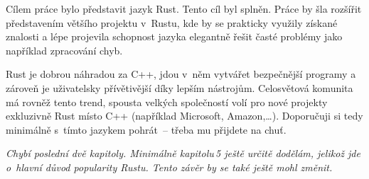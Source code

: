 \documentclass[main.tex]{subfiles}
\begin{document}

Cílem práce bylo představit jazyk Rust. Tento cíl byl splněn. Práce by šla rozšířit
představením většího projektu v~Rustu, kde by se prakticky využily získané znalosti a lépe
projevila schopnost jazyka elegantně řešit časté problémy jako například zpracování chyb.

Rust je dobrou náhradou za C++, jdou v~něm vytvářet bezpečnější programy a zároveň je
uživatelsky přívětivější díky lepším nástrojům. Celosvětová komunita má rovněž tento
trend, spousta velkých společností volí pro nové projekty exkluzivně Rust místo C++
(například Microsoft, Amazon,\dots). Doporučuji si tedy minimálně s~tímto jazykem
pohrát~-- třeba mu přijdete na chuť.

\emph{
    Chybí poslední dvě kapitoly. Minimálně kapitolu\,5 ještě určitě dodělám, jelikož jde
    o~hlavní důvod popularity Rustu. Tento závěr by se také ještě mohl změnit.
}
\end{document}
